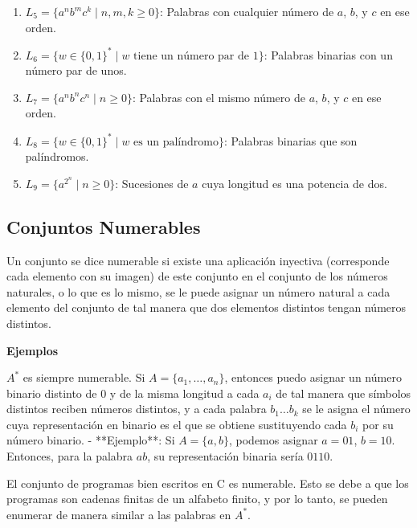 \documentclass[12pt]{report} %
\providecommand{\tightlist}{%
  \setlength{\itemsep}{0pt}\setlength{\parskip}{0pt}}
\begin{document}
\begin{enumerate}
\def\labelenumi{\arabic{enumi}.}
\tightlist
\item
  \(L_5 = \{a^n b^m c^k \mid n, m, k \geq 0\}\): Palabras con cualquier
  número de \(a\), \(b\), y \(c\) en ese orden.\\
\item
  \(L_6 = \{w \in \{0, 1\}^* \mid w \text{ tiene un número par de } 1\}\):
  Palabras binarias con un número par de unos.\\
\item
  \(L_7 = \{a^n b^n c^n \mid n \geq 0\}\): Palabras con el mismo número
  de \(a\), \(b\), y \(c\) en ese orden.\\
\item
  \(L_8 = \{w \in \{0, 1\}^* \mid w \text{ es un palíndromo}\}\):
  Palabras binarias que son palíndromos.\\
\item
  \(L_9 = \{a^{2^n} \mid n \geq 0\}\): Sucesiones de \(a\) cuya longitud
  es una potencia de dos.
\end{enumerate}

\hypertarget{conjuntos-numerables}{%
\subsection{Conjuntos Numerables}\label{conjuntos-numerables}}

Un conjunto se dice numerable si existe una aplicación inyectiva
(corresponde cada elemento con su imagen) de este conjunto en el
conjunto de los números naturales, o lo que es lo mismo, se le puede
asignar un número natural a cada elemento del conjunto de tal manera que
dos elementos distintos tengan números distintos.

\textbf{Ejemplos}

\begin{ejemplo}
$A^*$ es siempre numerable. Si $A = \{a_1, \ldots, a_n\}$, entonces puedo asignar un número binario distinto de 0 y de la misma longitud a cada $a_i$ de tal manera que símbolos distintos reciben números distintos, y a cada palabra $b_1 \ldots b_k$ se le asigna el número cuya representación en binario es el que se obtiene sustituyendo cada $b_i$ por su número binario.  
    - **Ejemplo**: Si $A = \{a, b\}$, podemos asignar $a = 01$, $b = 10$. Entonces, para la palabra $ab$, su representación binaria sería $0110$.  
\end{ejemplo}

\begin{ejemplo}
El conjunto de programas bien escritos en C es numerable. Esto se debe a que los programas son cadenas finitas de un alfabeto finito, y por lo tanto, se pueden enumerar de manera similar a las palabras en $A^*$.  
\end{ejemplo}
\end{document}
